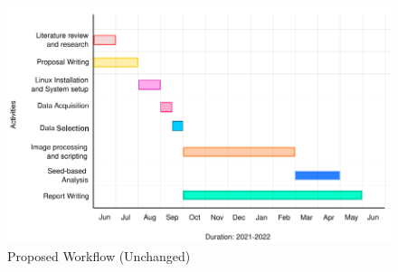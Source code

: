 \documentclass[12pt]{article}
\begin{document}
\begin{figure}[H]
  \centering
  \includegraphics[width=\textwidth]{./.img/proposed-workflow.png}
  \caption{Proposed Workflow (Unchanged)}%
  \label{fig:}
\end{figure}
\end{document}
